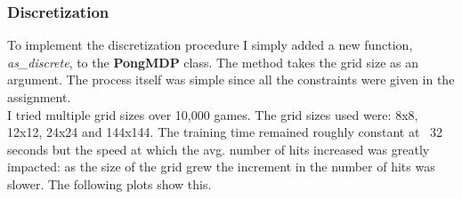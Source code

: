 \documentclass[11pt]{article}
\begin{document}
\subsubsection*{Discretization}
To implement the discretization procedure I simply added a new function, \textit{as\_discrete}, to the \textbf{PongMDP} class. The method takes the grid size as an argument. The process itself was simple since all the constraints were given in the assignment. \\

I tried multiple grid sizes over 10,000 games. The grid sizes used were: 8x8, 12x12, 24x24 and 144x144. The training time remained roughly constant at ~32 seconds but the speed at which the avg. number of hits increased was greatly impacted: as the size of the grid grew the increment in the number of hits was slower. The following plots show this.
\end{document}
